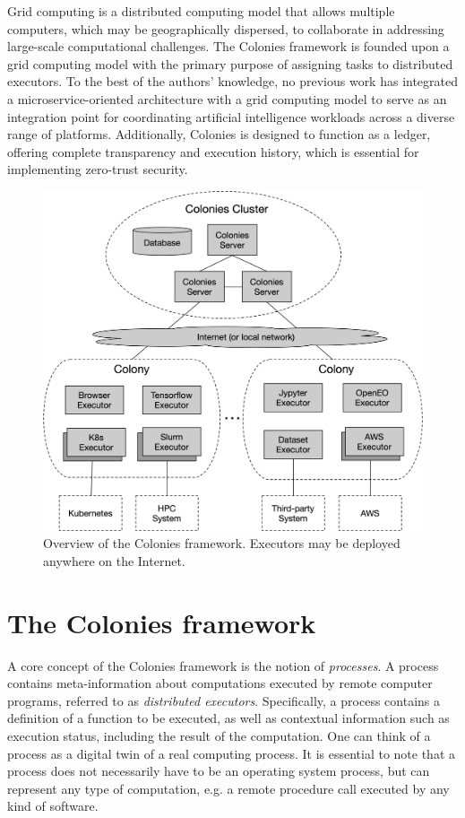 \documentclass{article}
\begin{document}
Grid computing \cite{grid_computing} is a distributed computing model that allows multiple computers, which may be geographically dispersed, to collaborate in addressing large-scale computational challenges. The Colonies framework is founded upon a grid computing model with the primary purpose of assigning tasks to distributed executors. To the best of the authors' knowledge, no previous work has integrated a microservice-oriented architecture with a grid computing model to serve as an integration point for coordinating artificial intelligence workloads across a diverse range of platforms. Additionally, Colonies is designed to function as a ledger, offering complete transparency and execution history, which is essential for implementing zero-trust security.

\begin{figure}[t]
	\centering
    \includegraphics[scale=0.45]{overview.png}
	\caption{Overview of the Colonies framework. Executors may be deployed anywhere on the Internet.}
	\label{fig:overview}
\end{figure}

\section{The Colonies framework}
\label{sec:headings}
A core concept of the Colonies framework is the notion of \emph{processes}. A process contains meta-information about computations executed by remote computer programs, referred to as \emph{distributed executors}. Specifically, a process contains a definition of a function to be executed, as well as contextual information such as execution status, including the result of the computation. One can think of a process as a digital twin of a real computing process. It is essential to note that a process does not necessarily have to be an operating system process, but can represent any type of computation, e.g. a remote procedure call executed by any kind of software. 
\end{document}
